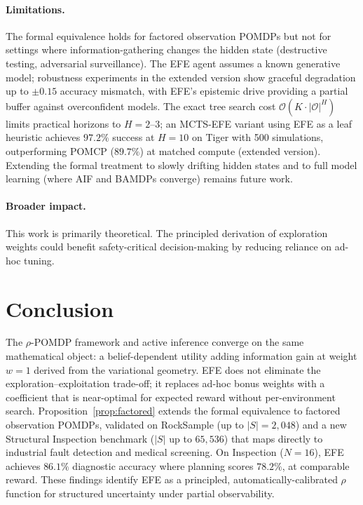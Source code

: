 \documentclass[runningheads]{llncs}
\begin{document}
\paragraph{Limitations.}
The formal equivalence holds for factored observation POMDPs but not for settings where information-gathering changes the hidden state (destructive testing, adversarial surveillance). The EFE agent assumes a known generative model; robustness experiments in the extended version show graceful degradation up to $\pm 0.15$ accuracy mismatch, with EFE's epistemic drive providing a partial buffer against overconfident models. The exact tree search cost $\mathcal{O}(K \cdot |\mathcal{O}|^H)$ limits practical horizons to $H{=}2$--$3$; an MCTS-EFE variant using EFE as a leaf heuristic achieves $97.2\%$ success at $H{=}10$ on Tiger with 500 simulations, outperforming POMCP ($89.7\%$) at matched compute (extended version). Extending the formal treatment to slowly drifting hidden states and to full model learning (where AIF and BAMDPs converge) remains future work.

\paragraph{Broader impact.}
This work is primarily theoretical. The principled derivation of exploration weights could benefit safety-critical decision-making by reducing reliance on ad-hoc tuning.

\section{Conclusion}

The $\rho$-POMDP framework and active inference converge on the same mathematical object: a belief-dependent utility adding information gain at weight $w{=}1$ derived from the variational geometry. EFE does not eliminate the exploration--exploitation trade-off; it replaces ad-hoc bonus weights with a coefficient that is near-optimal for expected reward without per-environment search. Proposition~\ref{prop:factored} extends the formal equivalence to factored observation POMDPs, validated on RockSample (up to $|S|{=}2{,}048$) and a new Structural Inspection benchmark ($|S|$ up to $65{,}536$) that maps directly to industrial fault detection and medical screening. On Inspection ($N{=}16$), EFE achieves $86.1\%$ diagnostic accuracy where planning scores $78.2\%$, at comparable reward. These findings identify EFE as a principled, automatically-calibrated $\rho$ function for structured uncertainty under partial observability.
\end{document}
